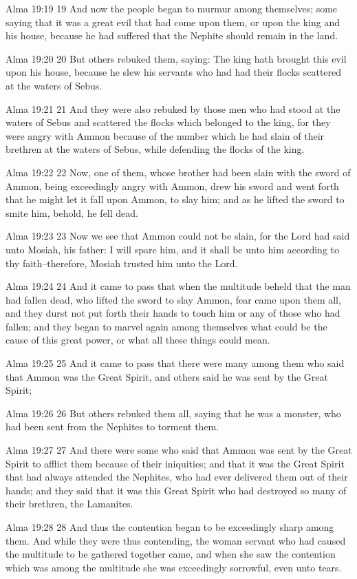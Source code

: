 Alma 19:19
 19 And now the people began to murmur among themselves; some
saying that it was a great evil that had come upon them, or upon
the king and his house, because he had suffered that the Nephite
should remain in the land.

Alma 19:20
 20 But others rebuked them, saying: The king hath brought this
evil upon his house, because he slew his servants who had had
their flocks scattered at the waters of Sebus.

Alma 19:21
 21 And they were also rebuked by those men who had stood at the
waters of Sebus and scattered the flocks which belonged to the
king, for they were angry with Ammon because of the number which
he had slain of their brethren at the waters of Sebus, while
defending the flocks of the king.

Alma 19:22
 22 Now, one of them, whose brother had been slain with the sword
of Ammon, being exceedingly angry with Ammon, drew his sword and
went forth that he might let it fall upon Ammon, to slay him; and
as he lifted the sword to smite him, behold, he fell dead.

Alma 19:23
 23 Now we see that Ammon could not be slain, for the Lord had
said unto Mosiah, his father: I will spare him, and it shall be
unto him according to thy faith--therefore, Mosiah trusted him
unto the Lord.

Alma 19:24
 24 And it came to pass that when the multitude beheld that the
man had fallen dead, who lifted the sword to slay Ammon, fear
came upon them all, and they durst not put forth their hands to
touch him or any of those who had fallen; and they began to
marvel again among themselves what could be the cause of this
great power, or what all these things could mean.

Alma 19:25
 25 And it came to pass that there were many among them who said
that Ammon was the Great Spirit, and others said he was sent by
the Great Spirit;

Alma 19:26
 26 But others rebuked them all, saying that he was a monster,
who had been sent from the Nephites to torment them.

Alma 19:27
 27 And there were some who said that Ammon was sent by the Great
Spirit to afflict them because of their iniquities; and that it
was the Great Spirit that had always attended the Nephites, who
had ever delivered them out of their hands; and they said that it
was this Great Spirit who had destroyed so many of their
brethren, the Lamanites.

Alma 19:28
 28 And thus the contention began to be exceedingly sharp among
them. And while they were thus contending, the woman servant who
had caused the multitude to be gathered together came, and when
she saw the contention which was among the multitude she was
exceedingly sorrowful, even unto tears.

